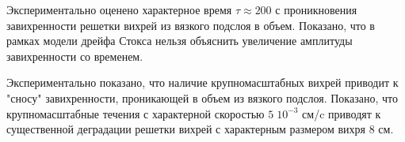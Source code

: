 
Экспериментально оценено характерное время $\tau \approx 200$ с проникновения завихренности решетки вихрей из вязкого подслоя в объем. Показано, что в рамках модели дрейфа Стокса нельзя объяснить увеличение амплитуды завихренности со временем.

Экспериментально показано, что наличие крупномасштабных вихрей приводит к "сносу" завихренности, проникающей в объем из вязкого подслоя. Показано, что крупномасштабные течения с характерной скоростью $5 \; 10^{-3}$ см/c приводят к существенной деградации решетки вихрей с характерным размером вихря 8 см.